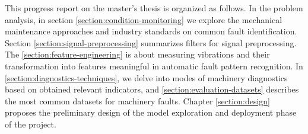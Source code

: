 This progress report on the master's thesis is organized as follows. In the problem analysis, in section \ref{section:condition-monitoring} we explore the mechanical maintenance approaches and industry standards on common fault identification. Section \ref{section:signal-preprocessing} summarizes filters for signal preprocessing. The \ref{section:feature-engineering} is about measuring vibrations and their transformation into features meaningful in automatic fault pattern recognition. In \ref{section:diagnostics-techniques}, we delve into modes of machinery diagnostics based on obtained relevant indicators, and \ref{section:evaluation-datasets} describes the most common datasets for machinery faults. Chapter \ref{section:design} proposes the preliminary design of the model exploration and deployment phase of the project.
